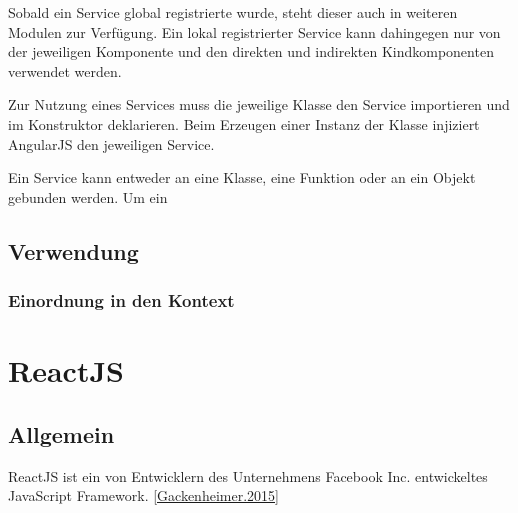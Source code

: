 Sobald ein Service global registrierte wurde, steht dieser auch in weiteren Modulen zur Verfügung. Ein lokal registrierter Service kann dahingegen nur von der jeweiligen Komponente und den direkten und indirekten Kindkomponenten verwendet werden. 

Zur Nutzung eines Services muss die jeweilige Klasse den Service importieren und im Konstruktor deklarieren. Beim Erzeugen einer Instanz der Klasse injiziert AngularJS den jeweiligen Service.\autocites[vgl.][92\psqq]{Steyer.2017}[vgl.][495\psqq]{Freeman.2018}    









Ein Service kann entweder an eine Klasse, eine Funktion oder an ein Objekt gebunden werden.\autocite[vgl.][90]{Steyer.2017} Um ein







\subsection{Verwendung}

\subsubsection{Einordnung in den Kontext}


\section{ReactJS}

\subsection{Allgemein}


ReactJS ist ein von Entwicklern des Unternehmens Facebook Inc. entwickeltes JavaScript Framework. \autoref{Gackenheimer.2015} 


%



